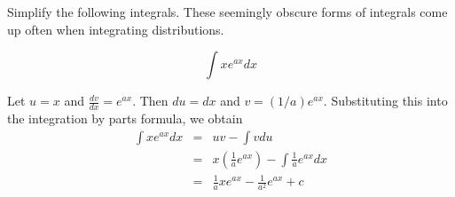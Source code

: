 \documentclass[
]{article}
\begin{document}
\begin{example}
\protect\hypertarget{exm:unnamed-chunk-31}{}\label{exm:unnamed-chunk-31}Simplify the following integrals. These seemingly obscure forms of integrals come up often when integrating distributions.

\[\int x e^{ax} dx\]
\end{example}

\begin{answer}
Let $u=x$ and $\frac{dv}{dx} = e^{ax}$.  Then $du=dx$ and $v=(1/a)e^{ax}$. Substituting this into the integration by parts formula, we obtain 	
\begin{eqnarray}
\int x e^{ax} dx &=& u v - \int v du\nonumber\\
				&=&x\left( \frac{1}{a}e^{ax}\right) -\int\frac{1}{a}e^{ax}dx\nonumber\\
				&=&\frac{1}{a}xe^{ax}-\frac{1}{a^2}e^{ax}+c\nonumber
\end{eqnarray}

\end{answer}
\end{document}
